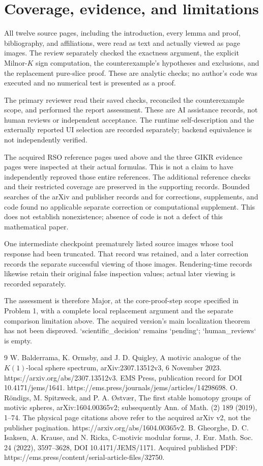 \documentclass[10pt]{article}
\begin{document}
\section*{Coverage, evidence, and limitations}
All twelve source pages, including the introduction, every lemma and proof, bibliography, and affiliations, were read as text and actually viewed as page images. The review separately checked the exactness argument, the explicit Milnor-\(K\) sign computation, the counterexample’s hypotheses and exclusions, and the replacement pure-slice proof. These are analytic checks; no author’s code was executed and no numerical test is presented as a proof.\par
The primary reviewer read their saved checks, reconciled the counterexample scope, and performed the report assessment. These are AI assistance records, not human reviews or independent acceptance. The runtime self-description and the externally reported UI selection are recorded separately; backend equivalence is not independently verified.\par
The acquired RSO reference pages used above and the three GIKR evidence pages were inspected at their actual formulas. This is not a claim to have independently reproved those entire references. The additional reference checks and their restricted coverage are preserved in the supporting records. Bounded searches of the arXiv and publisher records and for corrections, supplements, and code found no applicable separate correction or computational supplement. This does not establish nonexistence; absence of code is not a defect of this mathematical paper.\par
One intermediate checkpoint prematurely listed source images whose tool response had been truncated. That record was retained, and a later correction records the separate successful viewing of those images. Rendering-time records likewise retain their original false inspection values; actual later viewing is recorded separately.\par
The assessment is therefore Major, at the core-proof-step scope specified in Problem 1, with a complete local replacement argument and the separate comparison limitation above. The acquired version’s main localization theorem has not been disproved. `scientific\_decision` remains `pending`; `human\_reviews` is empty.\par
9 W. Balderrama, K. Ormsby, and J. D. Quigley, A motivic analogue of the \(K(1)\)-local sphere spectrum, arXiv:2307.13512v3, 6 November 2023. https://arxiv.org/abs/2307.13512v3. EMS Press, publication record for DOI 10.4171/jems/1641. https://ems.press/journals/jems/articles/14298698. O. Röndigs, M. Spitzweck, and P. A. Østvær, The first stable homotopy groups of motivic spheres, arXiv:1604.00365v2; subsequently Ann. of Math. (2) 189 (2019), 1–74. The physical page citations above refer to the acquired arXiv v2, not the publisher pagination. https://arxiv.org/abs/1604.00365v2. B. Gheorghe, D. C. Isaksen, A. Krause, and N. Ricka, \(\mathbb C\)-motivic modular forms, J. Eur. Math. Soc. 24 (2022), 3597–3628, DOI 10.4171/JEMS/1171. Acquired published PDF: https://ems.press/content/serial-article-files/32750.\par
\end{document}
